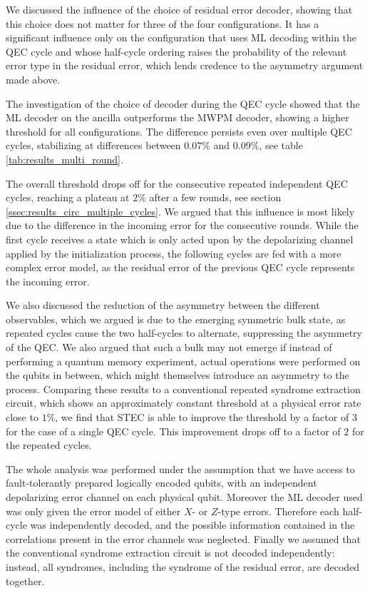 We discussed the influence of the choice of residual error decoder, showing that this
choice does not matter for three of the four configurations. It has a significant influence only on
the configuration that uses ML decoding within the QEC cycle and whose half-cycle ordering raises the
probability of the relevant error type in the residual error, which lends credence to the asymmetry argument made
above.

The investigation of the choice of decoder during the QEC cycle showed that the ML decoder on the ancilla outperforms the MWPM decoder,
showing a higher threshold for all configurations.
The difference persists even over multiple QEC cycles, stabilizing at differences between $0.07\%$ and $0.09\%$, see table \ref{tab:results_multi_round}.

The overall threshold drops off for the consecutive repeated independent QEC cycles, 
reaching a plateau at $2\%$ after a few rounds, see section \ref{ssec:results_circ_multiple_cycles}. 
We argued that this influence is most likely due to the difference in the incoming error for the consecutive rounds.
While the first cycle receives a state which is only acted upon by the depolarizing channel applied by the initialization process,
the following cycles are fed with a more complex error model, as the residual error of the previous QEC cycle represents the incoming error.

We also discussed the reduction of the asymmetry between the different observables, 
which we argued is due to the emerging symmetric bulk state, 
as repeated cycles cause the two half-cycles to alternate,
suppressing the asymmetry of the QEC.
We also argued that such a bulk may not emerge if instead of performing a quantum memory experiment,
actual operations were performed on the qubits in between, which might themselves introduce an asymmetry to the process.
Comparing these results to a conventional repeated syndrome extraction circuit, 
which shows an approximately constant threshold at a physical error rate close to $1\%$, 
we find that STEC is able to improve the threshold by a factor of $3$ for the case of a single QEC cycle. 
This improvement drops off to a factor of $2$ for the repeated cycles.

The whole analysis was performed under the assumption that we have access to fault-tolerantly prepared logically encoded qubits, 
with an independent depolarizing error channel on each physical qubit. 
Moreover the ML decoder used was only given the error model of either $X$- or $Z$-type errors. 
Therefore each half-cycle was independently decoded, and the possible information contained in the correlations present in the error channels was neglected.  
Finally we assumed that the conventional syndrome extraction circuit is not decoded independently: 
instead, all syndromes, including the syndrome of the residual error, are decoded together. 

